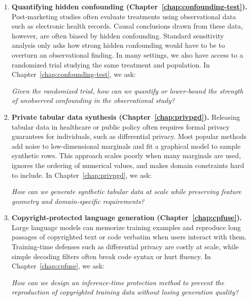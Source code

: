 \begin{enumerate}[leftmargin=*, itemsep=0.6em, topsep=0.3em]
  \item \textbf{Quantifying hidden confounding (Chapter~\ref{chap:confounding-test}).} Post-marketing studies often evaluate treatments using observational data such as electronic health records. Causal conclusions drawn from these data, however, are often biased by hidden confounding. Standard sensitivity analysis only asks how strong hidden confounding would have to be to overturn an observational finding. In many settings, we also have access to a randomized trial studying the same treatment and population. In Chapter~\ref{chap:confounding-test}, we ask:

  \begin{tcolorbox}[
    colback=gray!4,
    colframe=black!35,
    boxrule=0.5pt,
    arc=1.5pt,
    left=10pt,
    right=10pt,
    top=5pt,
    bottom=5pt,
    before skip=5pt,
    after skip=2pt
  ]
  \centering\emph{Given the randomized trial, how can we quantify or lower-bound the strength of unobserved confounding in the observational study?}
  \end{tcolorbox}

  \pagebreak
  \item \textbf{Private tabular data synthesis (Chapter~\ref{chap:privpgd}).} Releasing tabular data in healthcare or public policy often requires formal privacy guarantees for individuals, such as differential privacy. Most popular methods add noise to low-dimensional marginals and fit a graphical model to sample synthetic rows. This approach scales poorly when many marginals are used, ignores the ordering of numerical values, and makes domain constraints hard to include. In Chapter~\ref{chap:privpgd}, we ask:

  \begin{tcolorbox}[
    colback=gray!4,
    colframe=black!35,
    boxrule=0.5pt,
    arc=1.5pt,
    left=10pt,
    right=10pt,
    top=5pt,
    bottom=5pt,
    before skip=5pt,
    after skip=2pt
  ]
  \centering\emph{How can we generate synthetic tabular data at scale while preserving feature geometry and domain-specific requirements?}
  \end{tcolorbox}

  \item \textbf{Copyright-protected language generation (Chapter~\ref{chap:cpfuse}).} Large language models can memorize training examples and reproduce long passages of copyrighted text or code verbatim when users interact with them. Training-time defenses such as differential privacy are costly at scale, while simple decoding filters often break code syntax or hurt fluency. In Chapter~\ref{chap:cpfuse}, we ask:

  \begin{tcolorbox}[
    colback=gray!4,
    colframe=black!35,
    boxrule=0.5pt,
    arc=1.5pt,
    left=10pt,
    right=10pt,
    top=5pt,
    bottom=5pt,
    before skip=5pt,
    after skip=2pt
  ]
  \centering\emph{How can we design an inference-time protection method to prevent the reproduction of copyrighted training data without losing generation quality?}
  \end{tcolorbox}
\end{enumerate}

